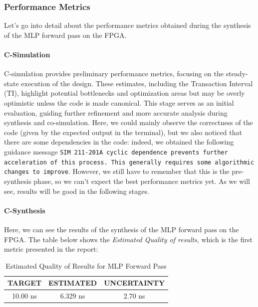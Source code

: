 \documentclass{article}
\begin{document}
\subsubsection{Performance Metrics}
Let's go into detail about the performance metrics obtained during the synthesis of the MLP forward pass on the FPGA.

\paragraph{C-Simulation}  
C-simulation provides preliminary performance metrics, focusing on the steady-state execution of the design. These estimates, including the Transaction Interval (TI), highlight potential bottlenecks and optimization areas but may be overly optimistic unless the code is made canonical. This stage serves as an initial evaluation, guiding further refinement and more accurate analysis during synthesis and co-simulation.  
Here, we could mainly observe the correctness of the code (given by the expected output in the terminal), but we also noticed that there are some dependencies in the code: indeed, we obtained the following guidance message \texttt{SIM 211-201A cyclic dependence prevents further acceleration of this process. This generally requires some algorithmic changes to improve}. However, we still have to remember that this is the pre-synthesis phase, so we can't expect the best performance metrics yet. As we will see, results will be good in the following stages. 


\paragraph{C-Synthesis}
Here, we can see the results of the synthesis of the MLP forward pass on the FPGA. The table below shows the \textit{Estimated Quality of results}, which is the first metric presented in the report:

\begin{table}[H]
    \centering
    \begin{tabular}{|c|c|c|}
        \hline
        \textbf{TARGET} & \textbf{ESTIMATED} & \textbf{UNCERTAINTY} \\
        \hline
        10.00 ns & 6.329 ns & 2.70 ns \\
        \hline
    \end{tabular}
    \caption{\centering Estimated Quality of Results for MLP Forward Pass}
    \label{tab:mlp-quality}
\end{table}
\end{document}
